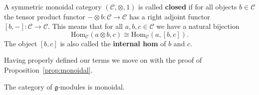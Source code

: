 \begin{definition}
  A symmetric monoidal category $ (\mathcal{C}, \otimes, 1) $ is called \textbf{closed} if for all objects $ b \in \mathcal{C} $ the tensor product functor $ - \otimes b:\mathcal{C} \to \mathcal{C} $ has a right adjoint functor $ [b, -]:\mathcal{C} \to \mathcal{C} $. This means that for all $ a,b,c \in \mathcal{C} $ we have a natural bijection
  \begin{equation}
    \text{Hom}_\mathcal{C}(a \otimes b, c) \cong \text{Hom}_\mathcal{C}(a, [b, c]).
  \end{equation}
  The object $ [b,c] $ is also called the \textbf{internal hom} of $ b $ and $ c $.
\end{definition}

Having properly defined our terms we move on with the proof of Proposition~\ref{prop:monoidal}.
\begin{lemma}
  The category of $ \mathfrak{g} $-modules is monoidal.
\end{lemma}

